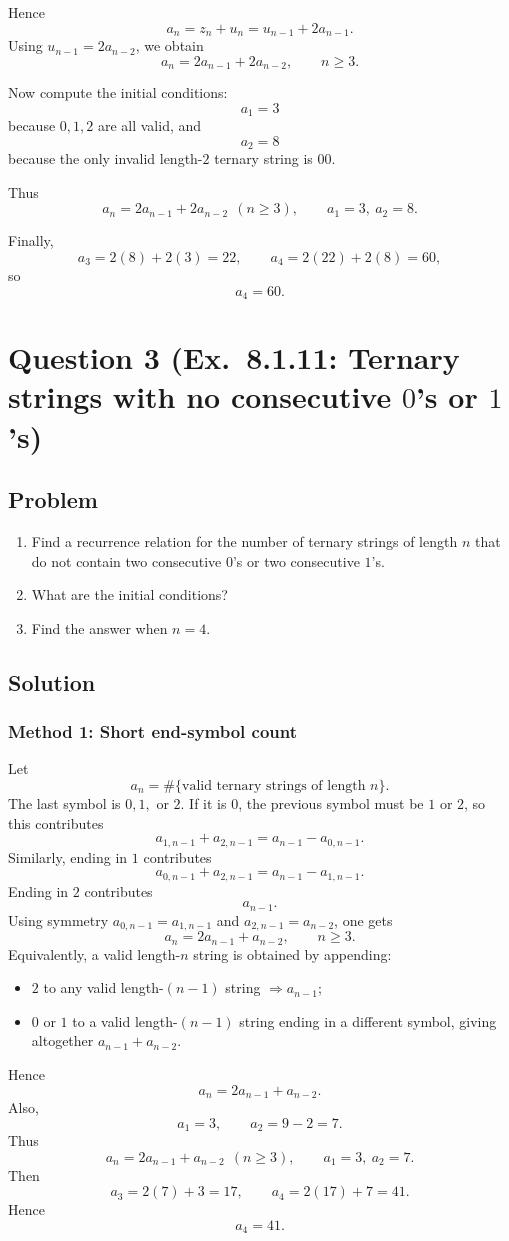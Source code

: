 \documentclass[12pt]{article}
\begin{document}
Hence
\[
a_n=z_n+u_n=u_{n-1}+2a_{n-1}.
\]
Using $u_{n-1}=2a_{n-2}$, we obtain
\[
a_n=2a_{n-1}+2a_{n-2}, \qquad n\ge 3.
\]

Now compute the initial conditions:
\[
a_1=3
\]
because $0,1,2$ are all valid, and
\[
a_2=8
\]
because the only invalid length-$2$ ternary string is $00$.

Thus
\[
\boxed{a_n=2a_{n-1}+2a_{n-2}\ \ (n\ge 3), \qquad a_1=3,\ a_2=8.}
\]

Finally,
\[
a_3=2(8)+2(3)=22,\qquad a_4=2(22)+2(8)=60,
\]
so
\[
\boxed{a_4=60.}
\]

\newpage

\section{Question 3 (Ex.\ 8.1.11: Ternary strings with no consecutive $0$'s or $1$'s)}

\subsection{Problem}
\begin{enumerate}[label=(\alph*)]
\item Find a recurrence relation for the number of ternary strings of length $n$ that do not contain two consecutive $0$'s or two consecutive $1$'s.
\item What are the initial conditions?
\item Find the answer when $n=4$.
\end{enumerate}

\subsection{Solution}

\subsubsection*{Method 1: Short end-symbol count}
Let
\[
a_n=\#\{\text{valid ternary strings of length }n\}.
\]
The last symbol is \(0,1,\) or \(2\).
If it is \(0\), the previous symbol must be \(1\) or \(2\), so this contributes
\[
a_{1,n-1}+a_{2,n-1}=a_{n-1}-a_{0,n-1}.
\]
Similarly, ending in \(1\) contributes
\[
a_{0,n-1}+a_{2,n-1}=a_{n-1}-a_{1,n-1}.
\]
Ending in \(2\) contributes
\[
a_{n-1}.
\]
Using symmetry \(a_{0,n-1}=a_{1,n-1}\) and \(a_{2,n-1}=a_{n-2}\), one gets
\[
a_n=2a_{n-1}+a_{n-2}, \qquad n\ge 3.
\]
Equivalently, a valid length-\(n\) string is obtained by appending:
\begin{itemize}[leftmargin=*]
  \item \(2\) to any valid length-\((n-1)\) string \(\Rightarrow a_{n-1}\);
  \item \(0\) or \(1\) to a valid length-\((n-1)\) string ending in a different symbol, giving altogether \(a_{n-1}+a_{n-2}\).
\end{itemize}
Hence
\[
a_n=2a_{n-1}+a_{n-2}.
\]
Also,
\[
a_1=3,\qquad a_2=9-2=7.
\]
Thus
\[
\boxed{a_n=2a_{n-1}+a_{n-2}\ \ (n\ge 3),\qquad a_1=3,\ a_2=7.}
\]
Then
\[
a_3=2(7)+3=17,\qquad a_4=2(17)+7=41.
\]
Hence
\[
\boxed{a_4=41.}
\]
\end{document}
